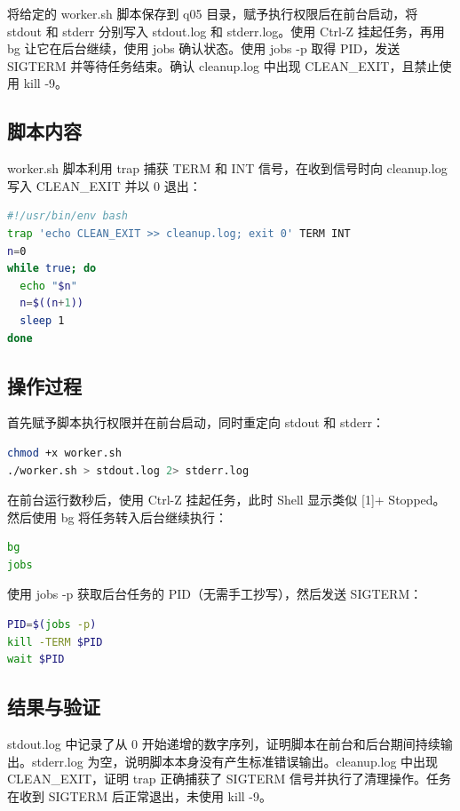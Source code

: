 \documentclass[UTF8]{ctexart}
\begin{document}
将给定的 worker.sh 脚本保存到 q05 目录，赋予执行权限后在前台启动，将 stdout 和 stderr 分别写入 stdout.log 和 stderr.log。使用 Ctrl-Z 挂起任务，再用 bg 让它在后台继续，使用 jobs 确认状态。使用 jobs -p 取得 PID，发送 SIGTERM 并等待任务结束。确认 cleanup.log 中出现 CLEAN\_EXIT，且禁止使用 kill -9。

\subsection{脚本内容}

worker.sh 脚本利用 trap 捕获 TERM 和 INT 信号，在收到信号时向 cleanup.log 写入 CLEAN\_EXIT 并以 0 退出：

\begin{lstlisting}[language=bash]
#!/usr/bin/env bash
trap 'echo CLEAN_EXIT >> cleanup.log; exit 0' TERM INT
n=0
while true; do
  echo "$n"
  n=$((n+1))
  sleep 1
done
\end{lstlisting}

\subsection{操作过程}

首先赋予脚本执行权限并在前台启动，同时重定向 stdout 和 stderr：

\begin{lstlisting}[language=bash]
chmod +x worker.sh
./worker.sh > stdout.log 2> stderr.log
\end{lstlisting}

在前台运行数秒后，使用 Ctrl-Z 挂起任务，此时 Shell 显示类似 [1]+ Stopped。然后使用 bg 将任务转入后台继续执行：

\begin{lstlisting}[language=bash]
bg
jobs
\end{lstlisting}

使用 jobs -p 获取后台任务的 PID（无需手工抄写），然后发送 SIGTERM：

\begin{lstlisting}[language=bash]
PID=$(jobs -p)
kill -TERM $PID
wait $PID
\end{lstlisting}

\subsection{结果与验证}

stdout.log 中记录了从 0 开始递增的数字序列，证明脚本在前台和后台期间持续输出。stderr.log 为空，说明脚本本身没有产生标准错误输出。cleanup.log 中出现 CLEAN\_EXIT，证明 trap 正确捕获了 SIGTERM 信号并执行了清理操作。任务在收到 SIGTERM 后正常退出，未使用 kill -9。
\end{document}
